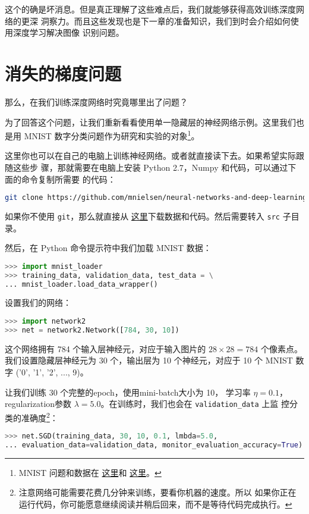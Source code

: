 这个的确是坏消息。但是真正理解了这些难点后，我们就能够获得高效训练深度网络的更深
洞察力。而且这些发现也是下一章的准备知识，我们到时会介绍如何使用深度学习解决图像
识别问题。

\section{消失的梯度问题}
\label{sec:the_vanishing_gradient_problem}

那么，在我们训练深度网络时究竟哪里出了问题？
 
为了回答这个问题，让我们重新看看使用单一隐藏层的神经网络示例。这里我们也是用
MNIST 数字分类问题作为研究和实验的对象\footnote{ MNIST 问题和数据在%
  \hyperref[sec:learning_with_gradient_descent]{这里}和%
  \hyperref[sec:implementing_our_network_to_classify_digits]{这里}。}。
 
这里你也可以在自己的电脑上训练神经网络。或者就直接读下去。如果希望实际跟随这些步
骤，那就需要在电脑上安装 Python 2.7，Numpy 和代码，可以通过下面的命令复制所需要
的代码：
\begin{lstlisting}[language=sh]
git clone https://github.com/mnielsen/neural-networks-and-deep-learning.git  
\end{lstlisting}

如果你不使用 \lstinline!git!，那么就直接从%
\href{https://github.com/mnielsen/neural-networks-and-deep-learning/archive/master.zip}{
  这里}下载数据和代码。然后需要转入 \lstinline!src! 子目录。

然后，在 Python 命令提示符中我们加载 MNIST 数据：
\begin{lstlisting}[language=Python]
>>> import mnist_loader
>>> training_data, validation_data, test_data = \
... mnist_loader.load_data_wrapper()  
\end{lstlisting}

设置我们的网络：
\begin{lstlisting}[language=Python]
>>> import network2 
>>> net = network2.Network([784, 30, 10]) 
\end{lstlisting}

这个网络拥有 784 个输入层神经元，对应于输入图片的 $28 \times 28 = 784$ 个像素点。
我们设置隐藏层神经元为 30 个，输出层为 10 个神经元，对应于 10 个 MNIST 数字
('0', '1', '2', ..., 9)。

让我们训练 30 个完整的\gls*{epoch}，使用\gls*{mini-batch}大小为 10， 学习率 $\eta = 0.1$，
\gls*{regularization}参数 $\lambda = 5.0$。在训练时，我们也会在 \lstinline!validation_data! 上监
控分类的准确度\footnote{注意网络可能需要花费几分钟来训练，要看你机器的速度。所以
  如果你正在运行代码，你可能愿意继续阅读并稍后回来，而不是等待代码完成执行。}：
\begin{lstlisting}[language=Python]
>>> net.SGD(training_data, 30, 10, 0.1, lmbda=5.0,  
... evaluation_data=validation_data, monitor_evaluation_accuracy=True) 
\end{lstlisting}

